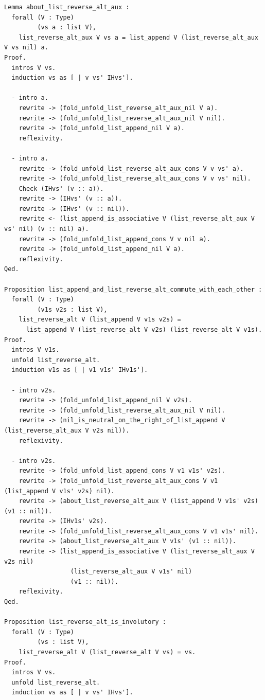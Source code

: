 \documentclass{article}
\begin{document}
\begin{lstlisting}
Lemma about_list_reverse_alt_aux :
  forall (V : Type)
         (vs a : list V),
    list_reverse_alt_aux V vs a = list_append V (list_reverse_alt_aux V vs nil) a.
Proof.
  intros V vs.
  induction vs as [ | v vs' IHvs'].

  - intro a.
    rewrite -> (fold_unfold_list_reverse_alt_aux_nil V a).
    rewrite -> (fold_unfold_list_reverse_alt_aux_nil V nil).
    rewrite -> (fold_unfold_list_append_nil V a).
    reflexivity.

  - intro a.
    rewrite -> (fold_unfold_list_reverse_alt_aux_cons V v vs' a).
    rewrite -> (fold_unfold_list_reverse_alt_aux_cons V v vs' nil).
    Check (IHvs' (v :: a)).
    rewrite -> (IHvs' (v :: a)).
    rewrite -> (IHvs' (v :: nil)).
    rewrite <- (list_append_is_associative V (list_reverse_alt_aux V vs' nil) (v :: nil) a).
    rewrite -> (fold_unfold_list_append_cons V v nil a).
    rewrite -> (fold_unfold_list_append_nil V a).
    reflexivity.
Qed.

Proposition list_append_and_list_reverse_alt_commute_with_each_other :
  forall (V : Type)
         (v1s v2s : list V),
    list_reverse_alt V (list_append V v1s v2s) =
      list_append V (list_reverse_alt V v2s) (list_reverse_alt V v1s).
Proof.
  intros V v1s.
  unfold list_reverse_alt.
  induction v1s as [ | v1 v1s' IHv1s'].

  - intro v2s.
    rewrite -> (fold_unfold_list_append_nil V v2s).
    rewrite -> (fold_unfold_list_reverse_alt_aux_nil V nil).
    rewrite -> (nil_is_neutral_on_the_right_of_list_append V (list_reverse_alt_aux V v2s nil)).
    reflexivity.

  - intro v2s.
    rewrite -> (fold_unfold_list_append_cons V v1 v1s' v2s).
    rewrite -> (fold_unfold_list_reverse_alt_aux_cons V v1 (list_append V v1s' v2s) nil).
    rewrite -> (about_list_reverse_alt_aux V (list_append V v1s' v2s) (v1 :: nil)).
    rewrite -> (IHv1s' v2s).
    rewrite -> (fold_unfold_list_reverse_alt_aux_cons V v1 v1s' nil).
    rewrite -> (about_list_reverse_alt_aux V v1s' (v1 :: nil)).
    rewrite -> (list_append_is_associative V (list_reverse_alt_aux V v2s nil)
                  (list_reverse_alt_aux V v1s' nil)
                  (v1 :: nil)).
    reflexivity.
Qed.

Proposition list_reverse_alt_is_involutory :
  forall (V : Type)
         (vs : list V),
    list_reverse_alt V (list_reverse_alt V vs) = vs.
Proof.
  intros V vs.
  unfold list_reverse_alt.
  induction vs as [ | v vs' IHvs'].


\end{lstlisting}
\end{document}
